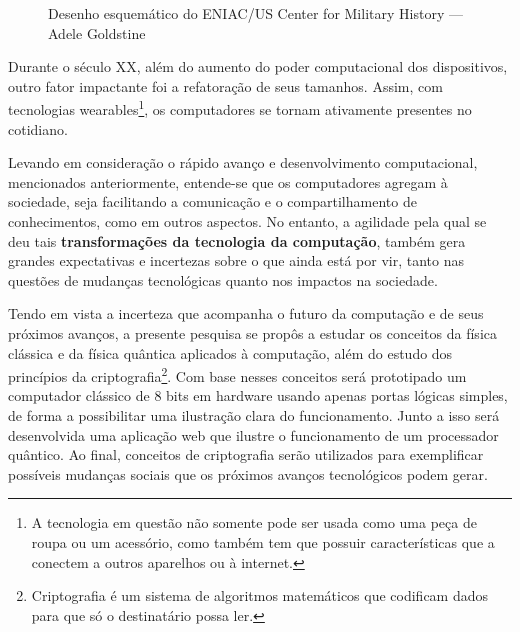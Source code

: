 \vspace{1cm}
\begin{figure}[H] \centering 
  \caption{\label{fig:2} Desenho esquemático do ENIAC/US Center for Military History —
  Adele Goldstine} 
\end{figure}


Durante o século XX, além do aumento do poder computacional dos dispositivos, outro fator impactante foi a refatoração de seus tamanhos. Assim, com tecnologias wearables\footnote{A tecnologia em questão não somente pode ser usada como uma peça de roupa ou um acessório, como também tem que possuir características que a conectem a outros aparelhos ou à internet.}, os computadores se tornam ativamente presentes no cotidiano.

Levando em consideração o rápido avanço e desenvolvimento computacional, mencionados anteriormente, entende-se que os computadores agregam à sociedade, seja facilitando a comunicação e o compartilhamento de conhecimentos, como em outros aspectos. No entanto, a agilidade pela qual se deu tais \textbf{transformações da tecnologia da computação}, também gera grandes expectativas e incertezas sobre o que ainda está por vir, tanto nas questões de mudanças tecnológicas quanto nos impactos na sociedade.

Tendo em vista a incerteza que acompanha o futuro da computação e de seus próximos avanços, a presente pesquisa se propôs a estudar os conceitos da física clássica e da física quântica aplicados à computação, além do estudo dos princípios da criptografia\footnote{Criptografia é um sistema de algoritmos matemáticos que codificam dados para que só o destinatário possa ler.}. Com base nesses conceitos será prototipado um computador clássico de 8 bits em hardware usando apenas portas lógicas simples, de forma a possibilitar uma ilustração clara do funcionamento. Junto a isso será desenvolvida uma aplicação web que ilustre o funcionamento de um processador quântico. Ao final, conceitos de criptografia serão utilizados para exemplificar possíveis mudanças sociais que os próximos avanços tecnológicos podem gerar.

